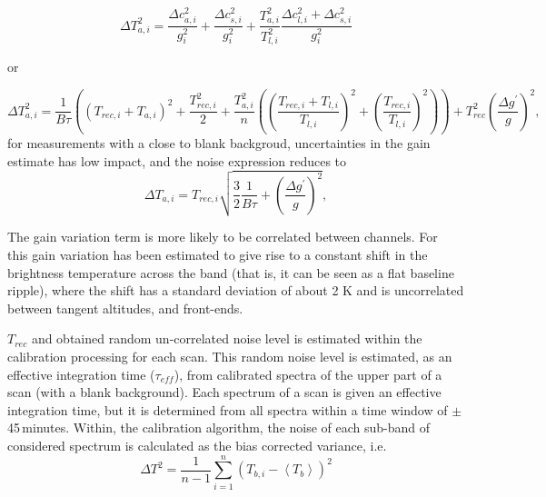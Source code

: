 \begin{equation}
\Delta T_{a,i}^{2} =  \frac{\Delta c_{a,i}^{2}}{g_{i}^2} + \frac{\Delta c_{s,i}^{2}}{g_{i}^2} +
     \frac{T_{a,i}^{2}}{T_{l,i}^2} \frac{\Delta c_{l,i}^{2} + \Delta c_{s,i}^{2}}{g_{i}^{2}}
\end{equation}

or

\begin{equation}
\Delta T_{a,i}^{2} =  \frac{1}{B\tau} \left( (T_{rec,i}+T_{a,i})^2 + \frac{T_{rec,i}^2}{2} + 
   \frac{T_{a,i}^{2}}{n} \left( \left( \frac{T_{rec,i} + T_{l,i}}{T_{l,i}} \right)^2 + \left( \frac{T_{rec,i} }{T_{l,i}} \right)^2 \right) \right) 
   + T_{rec}^{2}\left(\frac{\Delta g^{'}}{g}\right)^{2},
\end{equation}
for measurements with a close to blank backgroud, uncertainties in the gain estimate has low impact, and
the noise expression reduces to
\begin{equation}
\Delta T_{a,i} =  T_{rec,i}\sqrt{\frac{3}{2}\frac{1}{B\tau} + \left(\frac{\Delta g^{'}}{g}\right)^{2} },
\end{equation}




The gain variation term is more likely to be correlated between channels.
For \smr\, this gain variation has been estimated to give rise to a constant 
shift in the brightness temperature across the band (that is, it can 
be seen as a flat baseline ripple), where the shift
has a standard deviation of about 2 K and is uncorrelated 
between tangent altitudes, and front-ends.

\(T_{rec}\) and obtained random un-correlated noise level is estimated within the 
calibration processing for each scan.
This random noise level is estimated, as an effective integration time
(\(\tau_{eff}\)), from calibrated spectra of the upper part of a scan 
(with a blank background). Each spectrum of a scan is given an effective
integration time, but it is determined from all spectra within a time
window of \(\pm\)45\,minutes. 
Within, the calibration algorithm, the noise of each sub-band of
considered spectrum is calculated as the bias corrected variance, i.e.
\begin{equation}
\Delta T^{2} = \frac{1}{n-1}\sum_{i=1}^{n}(T_{b,i}-\left<T_{b}\right>)^{2}
\end{equation}

